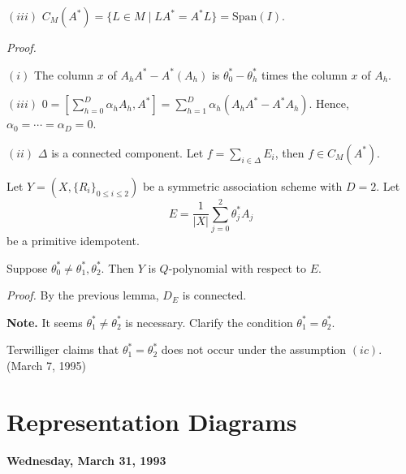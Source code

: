 \documentclass[
]{book}
\theoremstyle{definition}
\theoremstyle{definition}
\theoremstyle{definition}
\theoremstyle{definition}
\theoremstyle{remark}
\begin{document}
\((iii)\) \(C_M(A^*) = \{L\in M\mid LA^* = A^*L\} = \mathrm{Span}(I).\)

\emph{Proof.}

\((i)\) The column \(x\) of \(A_hA^* - A^*(A_h)\) is \(\theta^*_0-\theta^*_h\) times the column \(x\) of \(A_h\).

\((iii)\) \({\displaystyle 0 = \left[\sum_{h=0}^D\alpha_hA_h, A^*\right] = \sum_{h=1}^D\alpha_h(A_hA^*-A^*A_h)}\). Hence, \(\alpha_0 = \cdots =\alpha_D = 0\).

\((ii)\) \(\Delta\) is a connected component. Let \(f = \sum_{i\in \Delta}E_i\), then \(f\in C_M(A^*)\).

Let \(Y = (X, \{R_i\}_{0\leq i\leq 2})\) be a symmetric association scheme with \(D = 2\). Let
\[E = \frac{1}{|X|}\sum_{j=0}^2\theta^*_j A_j\]
be a primitive idempotent.

Suppose \(\theta^*_0\neq \theta_1^*, \theta^*_2\). Then \(Y\) is \(Q\)-polynomial with respect to \(E\).

\emph{Proof.}
By the previous lemma, \(D_E\) is connected.

\textbf{Note.}
It seems \(\theta^*_1 \neq \theta^*_2\) is necessary. Clarify the condition \(\theta^*_1 = \theta^*_2\).

Terwilliger claims that \(\theta^*_1 = \theta^*_2\) does not occur under the assumption \((ic)\). (March 7, 1995)

\hypertarget{lec26}{%
\chapter{Representation Diagrams}\label{lec26}}

\textbf{Wednesday, March 31, 1993}
\end{document}
